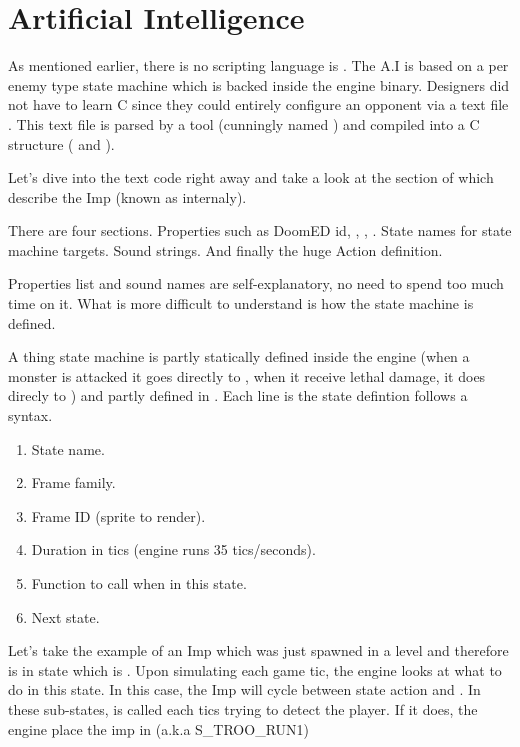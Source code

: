 \section{Artificial Intelligence}
As mentioned earlier, there is no scripting language is \doom. The A.I is based on a per enemy type state machine which is backed inside the engine binary. Designers did not have to learn C since they could entirely configure an opponent via a text file . This text file is parsed by a tool (cunningly named ) and compiled into a C structure ( and ).\\
\par
{}
\par
Let's dive into the text code right away and take a look at the section of   which describe the Imp (known as  internaly).\\
\par
{}


There are four sections. Properties such as DoomED id, , , . State names for state machine targets. Sound strings. And finally the huge Action definition.






Properties list and sound names are self-explanatory, no need to spend too much time on it. What is more difficult to understand is how the state machine is defined.\\
\par
A thing state machine is partly statically defined inside the engine (when a monster is attacked it goes directly to , when it receive lethal damage, it does direcly to ) and partly defined in . Each line is the state defintion follows a syntax.
\begin{enumerate}
\item State name.
\item Frame family.
\item Frame ID (sprite to render).
\item Duration in tics (engine runs 35 tics/seconds).
\item Function to call when in this state.
\item Next state.
\end{enumerate}
\par
Let's take the example of an Imp which was just spawned in a level and therefore is in state  which is . Upon simulating each game tic, the engine looks at what to do in this state. In this case, the Imp will cycle between state action  and . In these sub-states,  is called each tics trying to detect the player. If it does, the engine place the imp in  (a.k.a S\_TROO\_RUN1)\\
\par

